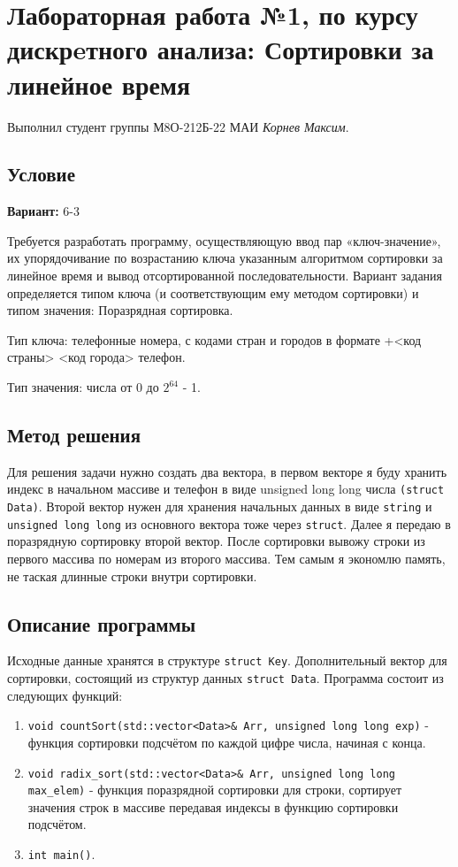 \documentclass[12pt]{article}
\begin{document}
\section*{Лабораторная работа №1, по курсу дискрeтного анализа: Сортировки за линейное время}

Выполнил студент группы М8О-212Б-22 МАИ \textit{Корнев Максим}.

\subsection*{Условие}

\textbf{Вариант:} 6-3

Требуется разработать программу, осуществляющую ввод пар «ключ-значение», их упорядочивание по возрастанию ключа указанным алгоритмом сортировки за линейное время и вывод отсортированной последовательности.
Вариант задания определяется типом ключа (и соответствующим ему методом сортировки) и типом значения:
Поразрядная сортировка.

Тип ключа: телефонные номера, с кодами стран и городов в формате +<код страны> <код города> телефон.

Тип значения: числа от 0 до $2^{64}$ - 1.

\newpage
\subsection*{Метод решения}

Для решения задачи нужно создать два вектора, в первом векторе я буду хранить индекс в начальном массиве и телефон в виде unsigned long long числа \texttt{(struct Data)}.
Второй вектор нужен для хранения начальных данных в виде \texttt{string} и \texttt{unsigned long long} из основного вектора тоже через \texttt{struct}.
Далее я передаю в поразрядную сортировку второй вектор. После сортировки вывожу строки из первого массива по номерам из второго массива.
Тем самым я экономлю память, не таская длинные строки внутри сортировки.

\newpage
\subsection*{Описание программы}

Исходные данные хранятся в структуре \texttt{struct Key}.
Дополнительный вектор для сортировки, состоящий из структур данных \texttt{struct Data}.
Программа состоит из следующих функций:
\begin{enumerate}
    \item \texttt{void countSort(std::vector<Data>& Arr, unsigned long long exp)}
    - функция сортировки подсчётом по каждой цифре числа, начиная с конца.
    \item \texttt{void radix\_sort(std::vector<Data>\& Arr, unsigned long long max\_elem)}
    - функция поразрядной сортировки для строки, сортирует значения строк в массиве передавая индексы в функцию сортировки подсчётом.
    \item \texttt{int main()}.
\end{enumerate}
\end{document}
